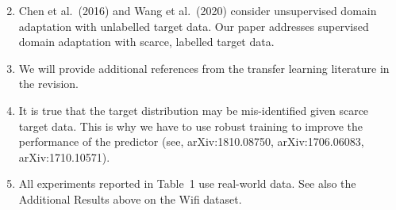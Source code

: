\documentclass{article}
\begin{document}
\vspace{-.1cm}
\begin{enumerate}[label=\arabic*), leftmargin = 6mm, nosep]
\setcounter{enumi}{1}
\item Chen et al.~(2016) and Wang et al.~(2020) consider unsupervised domain adaptation with {unlabelled} target data. Our paper addresses {supervised} domain adaptation with scarce, {labelled} target data. 
\item We will provide additional references from the transfer learning literature in the revision.
\item It is true that the target distribution may be mis-identified given scarce target data. This is why we have to use robust training to improve the performance of the predictor (see, arXiv:1810.08750, arXiv:1706.06083, arXiv:1710.10571). 
\item All experiments reported in Table~1 use real-world data. 
See also the Additional Results above on the Wifi dataset.
\end{enumerate}
\end{document}

